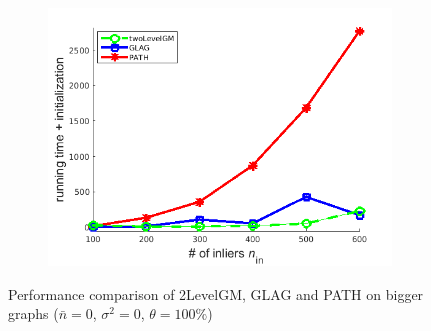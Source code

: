 \begin{figure}[h]
\begin{subfigure}[b]{0.32\textwidth}
			\includegraphics[scale=0.25]{"chapter3/fig/SyntheticTest_BigGraphs/descr/Results_v4.3.3/Test1/time_summary_avg1t"} 
		\end{subfigure} 	
	\caption[Performance comparison of 2LevelGM, GLAG and PATH on bigger graphs: test $1$]{Performance comparison of 2LevelGM, GLAG and PATH on bigger graphs ($\bar{n}=0$, $\sigma^2=0$, $\theta=100\%$)}
	\label{fig:synTest1_bigGraphs_ver433}
\end{figure}

